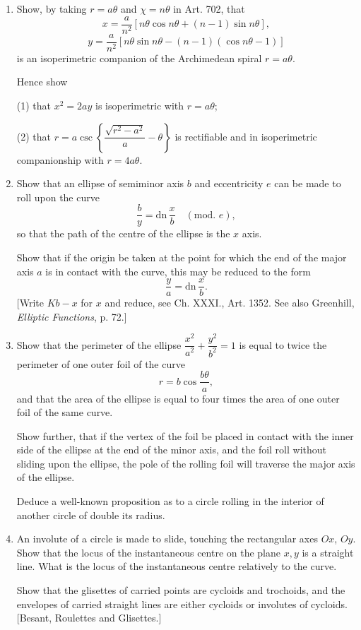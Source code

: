 \documentclass[11pt, a4paper]{article}
\newcommand{\source}[1]{\hfill\textnormal{[#1]}}
\begin{document}
\begin{enumerate}[leftmargin=2em]
\item Show, by taking $r=a\theta$ and $\chi=n\theta$ in Art. 702, that
\[
x=\frac{a}{n^2}[n\theta\cos n\theta+(n-1)\sin n\theta],
\]
\[
y=\frac{a}{n^2}[n\theta\sin n\theta-(n-1)(\cos n\theta-1)]
\]
is an isoperimetric companion of the Archimedean spiral $r=a\theta$.

Hence show

(1) that $x^2=2ay$ is isoperimetric with $r=a\theta$;

(2) that $r=a\csc\left\{\dfrac{\sqrt{r^2-a^2}}{a}-\theta\right\}$ is rectifiable and in isoperimetric companionship with $r=4a\theta$.

\item Show that an ellipse of semiminor axis $b$ and eccentricity $e$ can be made to roll upon the curve
\[
\frac{b}{y}=\mathrm{dn}\,\frac{x}{b}\quad(\text{mod. }e),
\]
so that the path of the centre of the ellipse is the $x$ axis.

Show that if the origin be taken at the point for which the end of the major axis $a$ is in contact with the curve, this may be reduced to the form
\[
\frac{y}{a}=\mathrm{dn}\,\frac{x}{b}.
\]
[Write $Kb-x$ for $x$ and reduce, see Ch. XXXI., Art. 1352. See also Greenhill, \textit{Elliptic Functions}, p. 72.]

\item Show that the perimeter of the ellipse $\dfrac{x^2}{a^2}+\dfrac{y^2}{b^2}=1$ is equal to twice the perimeter of one outer foil of the curve
\[
r=b\cos\frac{b\theta}{a},
\]
and that the area of the ellipse is equal to four times the area of one outer foil of the same curve.

Show further, that if the vertex of the foil be placed in contact with the inner side of the ellipse at the end of the minor axis, and the foil roll without sliding upon the ellipse, the pole of the rolling foil will traverse the major axis of the ellipse.

Deduce a well-known proposition as to a circle rolling in the interior of another circle of double its radius.

\item An involute of a circle is made to slide, touching the rectangular axes $Ox$, $Oy$. Show that the locus of the instantaneous centre on the plane $x,y$ is a straight line. What is the locus of the instantaneous centre relatively to the curve.

Show that the glisettes of carried points are cycloids and trochoids, and the envelopes of carried straight lines are either cycloids or involutes of cycloids. \source{Besant, Roulettes and Glisettes.}


\end{enumerate}
\end{document}

